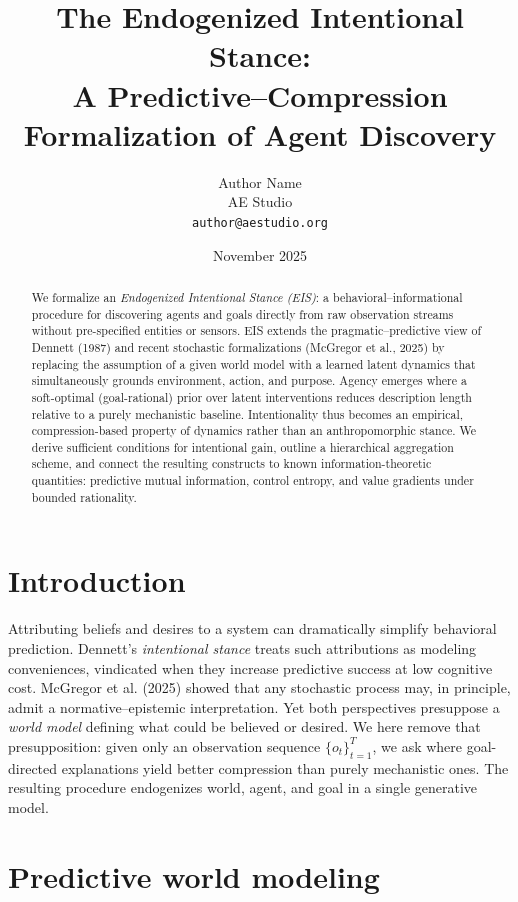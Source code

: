 \documentclass[11pt]{article}
\title{\textbf{The Endogenized Intentional Stance:\\
A Predictive–Compression Formalization of Agent Discovery}}
\author{Author Name\\AE Studio\\\texttt{author@aestudio.org}}
\date{November 2025}
\begin{document}
\maketitle

\begin{abstract}
We formalize an \emph{Endogenized Intentional Stance (EIS)}: a behavioral–informational procedure for discovering agents and goals directly from raw observation streams without pre-specified entities or sensors.  EIS extends the pragmatic–predictive view of Dennett (1987) and recent stochastic formalizations (McGregor et al., 2025) by replacing the assumption of a given world model with a learned latent dynamics that simultaneously grounds environment, action, and purpose.  Agency emerges where a soft-optimal (goal-rational) prior over latent interventions reduces description length relative to a purely mechanistic baseline.  Intentionality thus becomes an empirical, compression-based property of dynamics rather than an anthropomorphic stance.  We derive sufficient conditions for intentional gain, outline a hierarchical aggregation scheme, and connect the resulting constructs to known information-theoretic quantities: predictive mutual information, control entropy, and value gradients under bounded rationality.
\end{abstract}

\section{Introduction}

Attributing beliefs and desires to a system can dramatically simplify behavioral prediction.  Dennett’s \emph{intentional stance} treats such attributions as modeling conveniences, vindicated when they increase predictive success at low cognitive cost.  McGregor et al. (2025) showed that any stochastic process may, in principle, admit a normative–epistemic interpretation.  Yet both perspectives presuppose a \emph{world model} defining what could be believed or desired.  We here remove that presupposition: given only an observation sequence $\{o_t\}_{t=1}^T$, we ask where goal-directed explanations yield better compression than purely mechanistic ones.  The resulting procedure endogenizes world, agent, and goal in a single generative model.

\section{Predictive world modeling}
\end{document}

